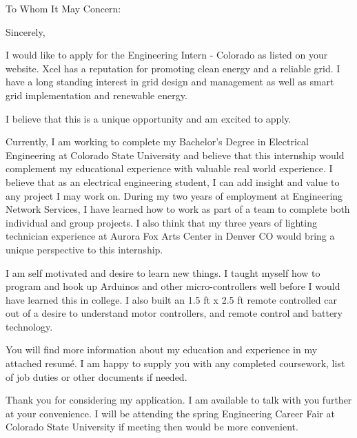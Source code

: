 \documentclass[11pt,letterpaper,sans]{moderncv}        %
\begin{document}



\clearpage
{}
\date{\today}
\opening{To Whom It May Concern:}
\closing{Sincerely,}
\makelettertitle

I would like to apply for the Engineering Intern - Colorado as listed on your website. Xcel has a reputation for promoting clean energy and a reliable grid. I have a long standing interest in grid design and management as well as smart grid implementation and renewable energy. 

I believe that this is a unique opportunity and am excited to apply.

Currently, I am working to complete my Bachelor's Degree in Electrical Engineering at Colorado State University and believe that this internship would complement my educational experience with valuable real world experience. I believe that as an electrical engineering student, I can add insight and value to any project I may work on. During my two years of employment at Engineering Network Services, I have learned how to work as part of a team to complete both individual and group projects. I also think that my three years of lighting technician experience at Aurora Fox Arts Center in Denver CO would bring a unique perspective to this internship.  

I am self motivated and desire to learn new things. I taught myself how to program and hook up Arduinos and other micro-controllers well before I would have learned this in college. I also built an 1.5 ft x 2.5 ft remote controlled car out of a desire to understand motor controllers, and remote control and battery technology.

You will find more information about my education and experience in my attached resum\'e. I am happy to supply you with any completed coursework, list of job duties or other documents if needed.

Thank you for considering my application. I am available to talk with you further at your convenience. I will be attending the spring Engineering Career Fair at Colorado State University if meeting then would be more convenient.



\makeletterclosing
\end{document}
